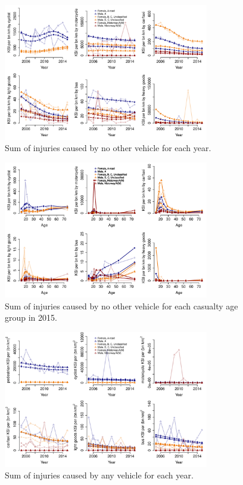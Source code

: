 \documentclass{article}
\begin{document}
\begin{figure}[H]
\centering
\includegraphics[width=0.8\textwidth]{NOVpredYear.pdf}
\caption{\small Sum of injuries caused by no other vehicle for each year.}
\label{NOVpredYear}
\end{figure}

\begin{figure}[H]
\centering
\includegraphics[width=0.8\textwidth]{NOVpredAge2015.pdf}
\caption{\small Sum of injuries caused by no other vehicle for each casualty age group in 2015.}
\label{NOVpredAge2015}
\end{figure}

\begin{figure}[H]
\centering
\includegraphics[width=0.8\textwidth]{pred6year.pdf}
\caption{\small Sum of injuries caused by any vehicle for each year.}
\label{pred6year}
\end{figure}
\end{document}
